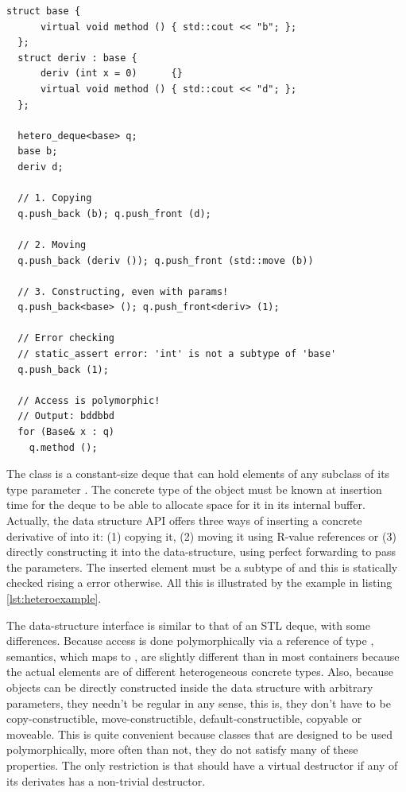 \begin{lstlisting}[float=h!,caption=Example of usage of heterogeneous deques,label=lst:heteroexample]
  struct base {
      virtual void method () { std::cout << "b"; };
  };
  struct deriv : base { 
      deriv (int x = 0)      {} 
      virtual void method () { std::cout << "d"; };
  };

  hetero_deque<base> q;
  base b;
  deriv d;

  // 1. Copying
  q.push_back (b); q.push_front (d);

  // 2. Moving
  q.push_back (deriv ()); q.push_front (std::move (b))

  // 3. Constructing, even with params!
  q.push_back<base> (); q.push_front<deriv> (1);

  // Error checking
  // static_assert error: 'int' is not a subtype of 'base'
  q.push_back (1); 

  // Access is polymorphic!
  // Output: bddbbd
  for (Base& x : q)
    q.method ();
\end{lstlisting}

The class
 is a
cons\-tant-size deque that can hold elements of any subclass of its
type parameter . The concrete type of the object must be
known at insertion time for the deque to be able to allocate space for
it in its internal buffer. Actually, the data structure API offers
three ways of inserting a concrete derivative of  into it:
(1) copying it, (2) moving it using R-value references or (3) directly
constructing it into the data-structure, using perfect forwarding to
pass the parameters. The inserted element must be a subtype of
 and this is statically checked rising a
 error otherwise. All this is illustrated by the
example in listing \ref{lst:heteroexample}.

The data-structure interface is similar to that of an STL deque, with
some differences. Because access is done polymorphically via a
reference of type ,  semantics, which
maps to , are slightly different than in most containers
because the actual elements are of different heterogeneous concrete
types. Also, because objects can be directly constructed inside the
data structure with arbitrary parameters, they needn't be regular in
any sense, this is, they don't have to be copy-constructible,
move-constructible, default-constructible, copyable or moveable. This
is quite convenient because classes that are designed to be used
polymorphically, more often than not, they do not satisfy many of these
properties. The only restriction is that  should have a
virtual destructor if any of its derivates has a non-trivial
destructor.

